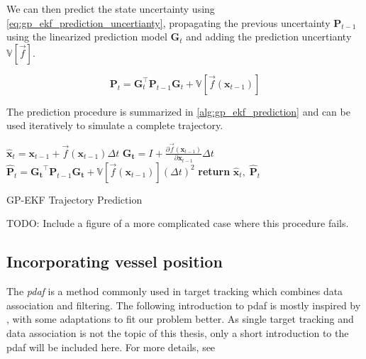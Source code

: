 We can then predict the state uncertainty using \cref{eq:gp_ekf_prediction_uncertianty}, propagating the previous uncertainty $\boldsymbol{P}_{t-1}$ using the linearized prediction model $\boldsymbol{G}_t$ and adding the prediction uncertianty $\mathbb{V}[\vec{f}]$.

\begin{equation}\label{eq:gp_ekf_prediction_uncertianty}
    \boldsymbol{P}_t = \boldsymbol{G}_t^\intercal \boldsymbol{P}_{t-1} \boldsymbol{G}_t + \mathbb{V}[\vec{f}(\boldsymbol{x}_{t-1})]
\end{equation}

The prediction procedure is summarized in \cref{alg:gp_ekf_prediction} and can be used iteratively to simulate a complete trajectory. 

\begin{algorithm}[h]
    \begin{algorithmic}[1]
        \State $\hat{\boldsymbol{x}}_{t} = \boldsymbol{x}_{t-1} + \vec{f}(\boldsymbol{x}_{t-1}) \Delta t$
        \State $\boldsymbol{G_t} = I + \frac{\partial \vec{f}(\boldsymbol{x}_{t-1})}{\partial \boldsymbol{x}_{t-1}} \Delta t$
        \State $\hat{\boldsymbol{P}}_t = \boldsymbol{G_t}^\intercal \boldsymbol{P}_{t-1} \boldsymbol{G_t} +\mathbb{V}[\vec{f}(\boldsymbol{x}_{t-1})] (\Delta t)^2$
        \State \textbf{return} $\hat{\boldsymbol{x}}_t, \; \hat{\boldsymbol{P}}_t$
        \EndProcedure
    \end{algorithmic}
    \caption{GP-EKF Trajectory Prediction}
    \label{alg:gp_ekf_prediction}
\end{algorithm}







TODO: Include a figure of a more complicated case where this procedure fails.

\subsection{Incorporating vessel position}
The \textit{\acrfull{pdaf}} is a method commonly used in target tracking which combines data association and filtering. The following introduction to \acrshort{pdaf} is mostly inspired by \cite{sensorfusjon}, with some adaptations to fit our problem better. As single target tracking and data association is not the topic of this thesis, only a short introduction to the \acrshort{pdaf} will be included here. For more details, see \cite{sensorfusjon,bar1995multitarget}

